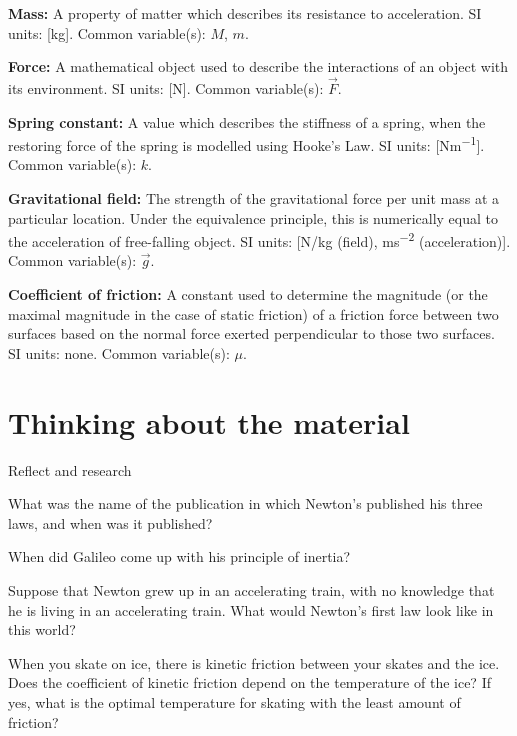 \begin{definitions}
	\textbf{Mass:} A property of matter which describes its resistance to acceleration. SI units: [\si{kg}]. Common variable(s): $M$, $m$.
	\item \textbf{Force:} A mathematical object used to describe the interactions of an object with its environment. SI units: [\si{N}]. Common variable(s): $\vec F$.
	\item \textbf{Spring constant:} A value which describes the stiffness of a spring, when the restoring force of the spring is modelled using Hooke's Law. SI units: [\si{Nm^{-1}}]. Common variable(s): $k$.
	\item \textbf{Gravitational field:} The strength of the gravitational force per unit mass at a particular location. Under the equivalence principle, this is numerically equal to the acceleration of free-falling object. SI units: [\si{N/kg} (field), \si{ms^{-2}} (acceleration)]. Common variable(s): $\vec g$.
	\item \textbf{Coefficient of friction:} A constant used to determine the magnitude (or the maximal magnitude in the case of static friction) of a friction force between two surfaces based on the normal force exerted perpendicular to those two surfaces. SI units: none. Common variable(s): $\mu$.
\end{definitions}

\newpage

\section{Thinking about the material}
\begin{chapteractivity}{Reflect and research}
{
\item What was the name of the publication in which Newton's published his three laws, and when was it published?
\item When did Galileo come up with his principle of inertia?
\item Suppose that Newton grew up in an accelerating train, with no knowledge that he is living in an accelerating train. What would Newton's first law look like in this world?
\item When you skate on ice, there is kinetic friction between your skates and the ice. Does the coefficient of kinetic friction depend on the temperature of the ice? If yes, what is the optimal temperature for skating with the least amount of friction?
}
\end{chapteractivity}

